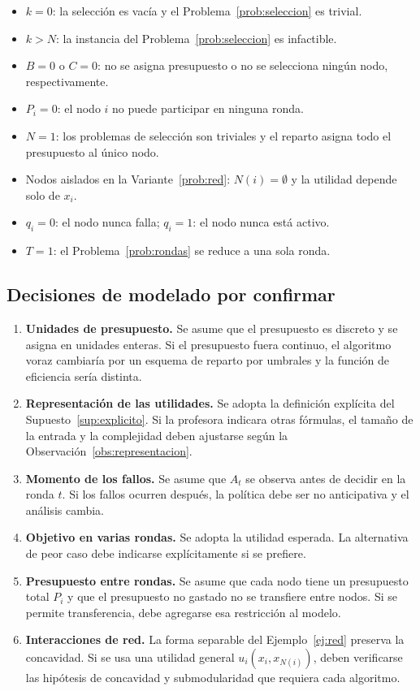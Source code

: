\documentclass[11pt,a4paper]{article}
\theoremstyle{definition}
\theoremstyle{plain}
\begin{document}
\begin{itemize}[leftmargin=*,label=$\bullet$]
  \item $k=0$: la selección es vacía y el Problema~\ref{prob:seleccion} es
  trivial.
  \item $k>N$: la instancia del Problema~\ref{prob:seleccion} es infactible.
  \item $B=0$ o $C=0$: no se asigna presupuesto o no se selecciona ningún nodo,
  respectivamente.
  \item $P_i=0$: el nodo $i$ no puede participar en ninguna ronda.
  \item $N=1$: los problemas de selección son triviales y el reparto asigna
  todo el presupuesto al único nodo.
  \item Nodos aislados en la Variante~\ref{prob:red}: $N(i)=\emptyset$ y la
  utilidad depende solo de $x_i$.
  \item $q_i=0$: el nodo nunca falla; $q_i=1$: el nodo nunca está activo.
  \item $T=1$: el Problema~\ref{prob:rondas} se reduce a una sola ronda.
\end{itemize}

\subsection{Decisiones de modelado por confirmar}

\begin{enumerate}[leftmargin=*,label=\arabic*)]
  \item \textbf{Unidades de presupuesto.} Se asume que el presupuesto es
  discreto y se asigna en unidades enteras. Si el presupuesto fuera continuo,
  el algoritmo voraz cambiaría por un esquema de reparto por umbrales y la
  función de eficiencia sería distinta.
  \item \textbf{Representación de las utilidades.} Se adopta la definición
  explícita del Supuesto~\ref{sup:explicito}. Si la profesora indicara otras
  fórmulas, el tamaño de la entrada y la complejidad deben ajustarse según la
  Observación~\ref{obs:representacion}.
  \item \textbf{Momento de los fallos.} Se asume que $A_t$ se observa antes de
  decidir en la ronda $t$. Si los fallos ocurren después, la política debe ser
  no anticipativa y el análisis cambia.
  \item \textbf{Objetivo en varias rondas.} Se adopta la utilidad esperada.
  La alternativa de peor caso debe indicarse explícitamente si se prefiere.
  \item \textbf{Presupuesto entre rondas.} Se asume que cada nodo tiene un
  presupuesto total $P_i$ y que el presupuesto no gastado no se transfiere
  entre nodos. Si se permite transferencia, debe agregarse esa restricción al
  modelo.
  \item \textbf{Interacciones de red.} La forma separable del
  Ejemplo~\ref{ej:red} preserva la concavidad. Si se usa una utilidad general
  $u_i(x_i,x_{N(i)})$, deben verificarse las hipótesis de concavidad y
  submodularidad que requiera cada algoritmo.
\end{enumerate}
\end{document}
